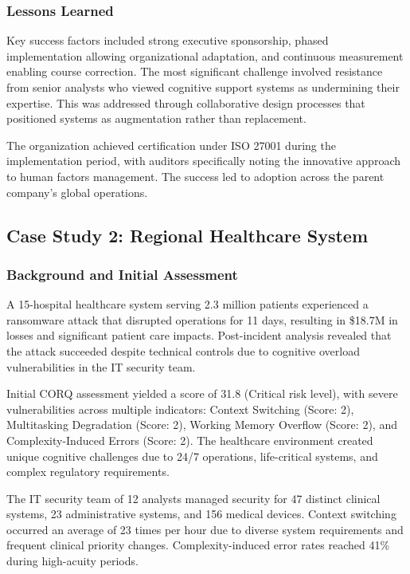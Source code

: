 \documentclass[11pt,a4paper]{article}
\begin{document}
\subsubsection{Lessons Learned}

Key success factors included strong executive sponsorship, phased implementation allowing organizational adaptation, and continuous measurement enabling course correction. The most significant challenge involved resistance from senior analysts who viewed cognitive support systems as undermining their expertise. This was addressed through collaborative design processes that positioned systems as augmentation rather than replacement.

The organization achieved certification under ISO 27001 during the implementation period, with auditors specifically noting the innovative approach to human factors management. The success led to adoption across the parent company's global operations.

\subsection{Case Study 2: Regional Healthcare System}

\subsubsection{Background and Initial Assessment}

A 15-hospital healthcare system serving 2.3 million patients experienced a ransomware attack that disrupted operations for 11 days, resulting in \$18.7M in losses and significant patient care impacts. Post-incident analysis revealed that the attack succeeded despite technical controls due to cognitive overload vulnerabilities in the IT security team.

Initial CORQ assessment yielded a score of 31.8 (Critical risk level), with severe vulnerabilities across multiple indicators: Context Switching (Score: 2), Multitasking Degradation (Score: 2), Working Memory Overflow (Score: 2), and Complexity-Induced Errors (Score: 2). The healthcare environment created unique cognitive challenges due to 24/7 operations, life-critical systems, and complex regulatory requirements.

The IT security team of 12 analysts managed security for 47 distinct clinical systems, 23 administrative systems, and 156 medical devices. Context switching occurred an average of 23 times per hour due to diverse system requirements and frequent clinical priority changes. Complexity-induced error rates reached 41\% during high-acuity periods.
\end{document}
